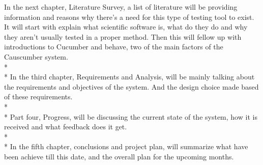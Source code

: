 In the next chapter, Literature Survey, a list of literature will be providing information and reasons why there’s a need for this type of testing tool to exist. It will start with explain what scientific software is, what do they do and why they aren’t usually tested in a proper method. Then this will fellow up with introductions to Cucumber and behave, two of the main factors of the Causcumber system. \\* \\* 
In the third chapter, Requirements and Analysis, will be mainly talking about the requirements and objectives of the system. And the design choice made based of these requirements. \\* \\*
Part four, Progress, will be discussing the current state of the system, how it is received and what feedback does it get. \\* \\*
In the fifth chapter, conclusions and project plan, will summarize what have been achieve till this date, and the overall plan for the upcoming months.



